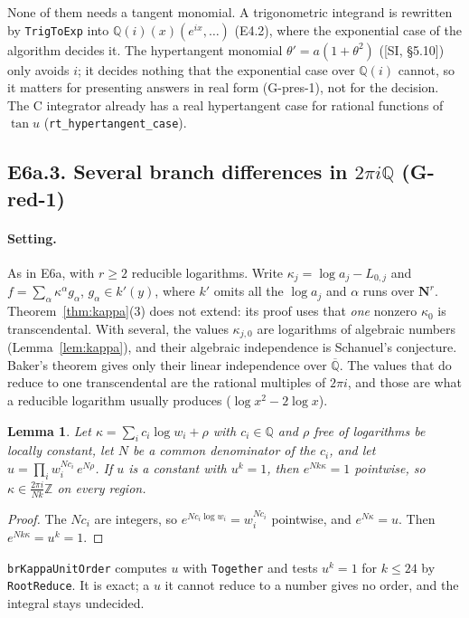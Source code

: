 \documentclass[11pt]{article}
\newtheorem{lemma}[theorem]{Lemma}
\theoremstyle{definition}
\theoremstyle{remark}
\newcommand{\Q}{\mathbb{Q}}
\newcommand{\Z}{\mathbb{Z}}
\newcommand{\Qbar}{\overline{\mathbb{Q}}}
\newcommand{\code}[1]{\texttt{#1}}
\begin{document}
None of them needs a tangent monomial. A trigonometric integrand is rewritten
by \code{TrigToExp} into $\Q(i)(x)(e^{ix},\dots)$ (E4.2), where the exponential
case of the algorithm decides it. The hypertangent monomial
$\theta'=a(1+\theta^2)$ ([SI, \S5.10]) only avoids $i$; it decides nothing that
the exponential case over $\Q(i)$ cannot, so it matters for presenting answers
in real form (G-pres-1), not for the decision. The C integrator already has a
real hypertangent case for rational functions of $\tan u$ (\code{rt\_hypertangent\_case}).

\subsection*{E6a.3. Several branch differences in $2\pi i\Q$ (G-red-1)}

\paragraph{Setting.} As in E6a, with $r\ge2$ reducible logarithms. Write
$\kappa_j=\log a_j-L_{0,j}$ and
$f=\sum_\alpha\kappa^\alpha g_\alpha$, $g_\alpha\in k'(y)$, where $k'$ omits all
the $\log a_j$ and $\alpha$ runs over $\mathbf N^r$. Theorem~\ref{thm:kappa}(3)
does not extend: its proof uses that \emph{one} nonzero $\kappa_0$ is
transcendental. With several, the values $\kappa_{j,0}$ are logarithms of
algebraic numbers (Lemma~\ref{lem:kappa}), and their algebraic independence is
Schanuel's conjecture. Baker's theorem gives only their linear independence
over $\Qbar$. The values that do reduce to one transcendental are the
rational multiples of $2\pi i$, and those are what a reducible logarithm
usually produces ($\log x^2-2\log x$).

\begin{lemma}\label{lem:E6a3unit}
Let $\kappa=\sum_ic_i\log w_i+\rho$ with $c_i\in\Q$ and $\rho$ free of
logarithms be locally constant, let $N$ be a common denominator of the $c_i$,
and let $u=\prod_iw_i^{Nc_i}\,e^{N\rho}$. If $u$ is a constant with $u^k=1$,
then $e^{Nk\kappa}=1$ pointwise, so $\kappa\in\frac{2\pi i}{Nk}\Z$ on every region.
\end{lemma}

\begin{proof}
The $Nc_i$ are integers, so $e^{Nc_i\log w_i}=w_i^{Nc_i}$ pointwise, and
$e^{N\kappa}=u$. Then $e^{Nk\kappa}=u^k=1$.
\end{proof}

\code{brKappaUnitOrder} computes $u$ with \code{Together} and tests
$u^k=1$ for $k\le24$ by \code{RootReduce}. It is exact; a $u$ it cannot reduce
to a number gives no order, and the integral stays undecided.
\end{document}
